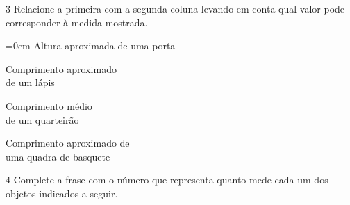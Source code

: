 \pagebreak
\num{3} Relacione a primeira com a segunda coluna levando em conta qual valor
pode corresponder à medida mostrada.

\begin{multicols}{2}\parindent=0em
Altura aproximada de uma porta\bigskip

Comprimento aproximado\\
de um lápis\bigskip

Comprimento médio\\
de um quarteirão\bigskip

Comprimento aproximado de\\
uma quadra de basquete

\columnbreak

\blue{20 cm}\bigskip

\bigskip

\bigskip

\end{multicols}


\num{4} Complete a frase com o número que representa quanto mede cada um dos
objetos indicados a seguir.

